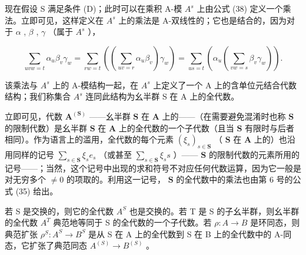 现在假设 S 满足条件 (D)；此时可以在乘积 A-模 \(A^{s}\) 上由公式 (38) 定义一个乘法。立即可见，这样定义在 \(A^{s}\) 上的乘法是 A-双线性的；它也是结合的，因为对于 \(\alpha\) , \(\beta\) , \(\gamma\) （属于 \(A^{s}\) ），

\[
\sum_ {u v w = t} \alpha_ {u} \beta_ {v} \gamma_ {w} = \sum_ {r w = t} \left(\left(\sum_ {u v = r} \alpha_ {u} \beta_ {v}\right) \gamma_ {w}\right) = \sum_ {u s = t} \left(\alpha_ {u} \left(\sum_ {v w = s} \beta_ {v} \gamma_ {w}\right)\right).
\]

该乘法与 \(A^{s}\) 上的 A-模结构一起，在 \(A^{s}\) 上定义了一个 A 上的含单位元结合代数结构；我们称集合 \(A^{s}\) 连同此结构为幺半群 S 在 A 上的全代数。

立即可见，代数 \(\mathbf{A}^{(\mathbf{S})}\) ——幺半群 \(\mathbf{S}\) 在 \(\mathbf{A}\) 上的——（在需要避免混淆时也称 \(\mathbf{S}\) 的限制代数）是幺半群 \(\mathbf{S}\) 在 \(\mathbf{A}\) 上的全代数的一个子代数（且当 \(\mathbf{S}\) 有限时与后者相同）。作为语言上的滥用，全代数的每个元素 \((\xi_s)_{s \in \mathbf{S}}\) （ \(\mathbf{S}\) 在 \(\mathbf{A}\) 上的）也沿用同样的记号 \(\sum_{s \in \mathbf{S}} \xi_s e_s\) （或甚至 \(\sum_{s \in \mathbf{S}} \xi_s s\) ）—— \(\mathbf{S}\) 的限制代数的元素所用的记号——；当然，这个记号中出现的求和符号不对应任何代数运算，因为它一般是对无穷多个 \(\neq 0\) 的项取的。利用这一记号， \(\mathbf{S}\) 的全代数中的乘法也由第 6 号的公式 (35) 给出。

若 S 是交换的，则它的全代数 \(A^{S}\) 也是交换的。若 T 是 S 的子幺半群，则幺半群的全代数 \(A^{T}\) 典范地等同于 S 的全代数的一个子代数。若 \(\rho: A \to B\) 是环同态，则典范扩张 \(\rho^{S}: A^{S} \to B^{S}\) 是从 S 在 A 上的全代数到 S 在 B 上的全代数中的 A-同态，它扩张了典范同态 \(A^{(S)} \to B^{(S)}\) 。
